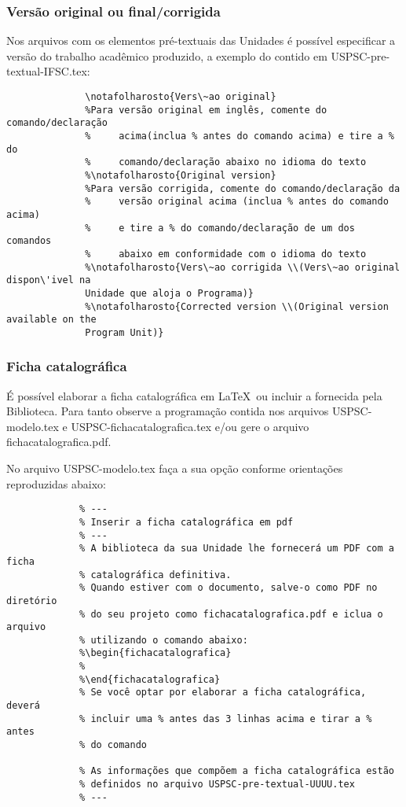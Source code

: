 \subsubsection{Versão original ou final/corrigida}
Nos arquivos com os elementos pré-textuais das Unidades é possível especificar a versão do trabalho acadêmico produzido, a exemplo do contido em USPSC-pre-textual-IFSC.tex:	  
			  \begin{verbatim}
			  \notafolharosto{Vers\~ao original}
			  %Para versão original em inglês, comente do comando/declaração 
			  %     acima(inclua % antes do comando acima) e tire a % do 
			  %     comando/declaração abaixo no idioma do texto
			  %\notafolharosto{Original version} 
			  %Para versão corrigida, comente do comando/declaração da 
			  %     versão original acima (inclua % antes do comando acima) 
			  %     e tire a % do comando/declaração de um dos comandos 
			  %     abaixo em conformidade com o idioma do texto
			  %\notafolharosto{Vers\~ao corrigida \\(Vers\~ao original dispon\'ivel na
			  Unidade que aloja o Programa)}
			  %\notafolharosto{Corrected version \\(Original version available on the
			  Program Unit)}
			  \end{verbatim}
			  
\subsubsection{Ficha catalográfica}
É possível elaborar a ficha catalográfica em \LaTeX\ ou incluir a fornecida pela Biblioteca. Para tanto observe a programação contida nos arquivos USPSC-modelo.tex e USPSC-fichacatalografica.tex e/ou gere o arquivo fichacatalografica.pdf.
	  
No arquivo USPSC-modelo.tex faça a sua opção conforme orientações reproduzidas abaixo:

			 \begin{verbatim}
			 % ---
			 % Inserir a ficha catalográfica em pdf
			 % ---
			 % A biblioteca da sua Unidade lhe fornecerá um PDF com a ficha
			 % catalográfica definitiva. 
			 % Quando estiver com o documento, salve-o como PDF no diretório
			 % do seu projeto como fichacatalografica.pdf e iclua o arquivo
			 % utilizando o comando abaixo:
			 %\begin{fichacatalografica}
			 %   
			 %\end{fichacatalografica}
			 % Se você optar por elaborar a ficha catalográfica, deverá 
			 % incluir uma % antes das 3 linhas acima e tirar a % antes
			 % do comando 
			 
			 % As informações que compõem a ficha catalográfica estão 
			 % definidos no arquivo USPSC-pre-textual-UUUU.tex
			 % ---
			 \end{verbatim} 
			 				
